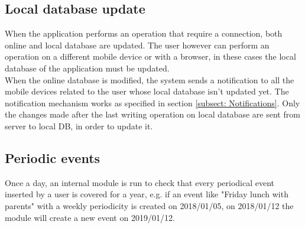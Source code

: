 \subsection{Local database update}
\label{subsect:Local database update}
When the application performs an operation that require a connection, both online and local database are updated. The user however can perform an operation on a different mobile device or with a browser, in these cases the local database of the application must be updated.\\
When the online database is modified, the system sends a notification to all the mobile devices related to the user whose local database isn't updated yet. The notification mechanism works as specified in section \ref{subsect: Notifications}. Only the changes made after the last writing operation on local database are sent from server to local DB, in order to update it.

\subsection{Periodic events}
\label{subsect:Periodic events}
Once a day, an internal module is run to check that every periodical event inserted by a user is covered for a year, e.g. if an event like "Friday lunch with parents" with a weekly periodicity is created on 2018/01/05, on 2018/01/12 the module will create a new event on 2019/01/12.
